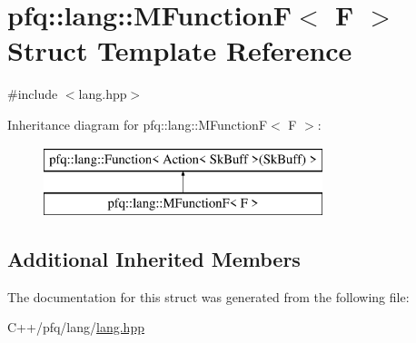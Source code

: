 \hypertarget{structpfq_1_1lang_1_1MFunctionF}{\section{pfq\+:\+:lang\+:\+:M\+Function\+F$<$ F $>$ Struct Template Reference}
\label{structpfq_1_1lang_1_1MFunctionF}
}


{\ttfamily \#include $<$lang.\+hpp$>$}

Inheritance diagram for pfq\+:\+:lang\+:\+:M\+Function\+F$<$ F $>$\+:\begin{figure}[H]
\begin{center}
\leavevmode
\includegraphics[height=2.000000cm]{structpfq_1_1lang_1_1MFunctionF}
\end{center}
\end{figure}
\subsection*{Additional Inherited Members}


The documentation for this struct was generated from the following file\+:\begin{DoxyCompactItemize}
\item 
C++/pfq/lang/\hyperlink{lang_8hpp}{lang.\+hpp}\end{DoxyCompactItemize}
